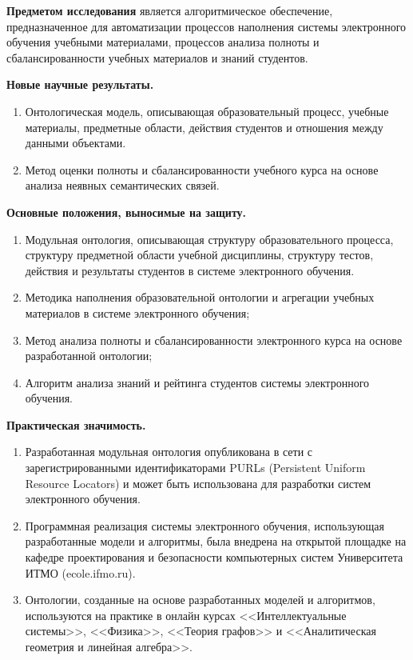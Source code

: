\textbf{Предметом исследования} является алгоритмическое обеспечение, предназначенное для автоматизации процессов наполнения системы электронного обучения учебными материалами, процессов анализа полноты и сбалансированности учебных материалов и знаний студентов. 

\textbf{Новые научные результаты.}
\begin{enumerate}
 \item Онтологическая модель, описывающая образовательный процесс, учебные материалы, предметные области, действия студентов и отношения между данными объектами. 
 \item Метод оценки полноты и сбалансированности учебного курса на основе анализа неявных семантических связей.
\end{enumerate}

\textbf{Основные положения, выносимые на защиту.}
\begin{enumerate}
 \item Модульная онтология, описывающая структуру образовательного процесса, структуру предметной области учебной дисциплины, структуру тестов, действия и результаты студентов в системе электронного обучения.
 \item Методика наполнения образовательной онтологии и агрегации учебных материалов в системе электронного обучения;
 \item Метод анализа полноты и сбалансированности электронного курса на основе разработанной онтологии;
 \item Алгоритм анализа знаний и рейтинга студентов системы электронного обучения.
 \end{enumerate}


\textbf{Практическая значимость.}
\begin{enumerate}
 \item Разработанная модульная онтология опубликована в сети с зарегистрированными идентификаторами PURLs (Persistent Uniform Resource Locators) и может быть использована для разработки систем электронного обучения.
 \item Программная реализация системы электронного обучения, использующая разработанные модели и алгоритмы, была внедрена на открытой площадке на кафедре проектирования и безопасности компьютерных систем Университета ИТМО (ecole.ifmo.ru). 
 \item Онтологии, созданные на основе разработанных моделей и алгоритмов, используются на практике в онлайн курсах <<Интеллектуальные системы>>, <<Физика>>, <<Теория графов>> и <<Аналитическая геометрия и линейная алгебра>>.
 \end{enumerate}
 
